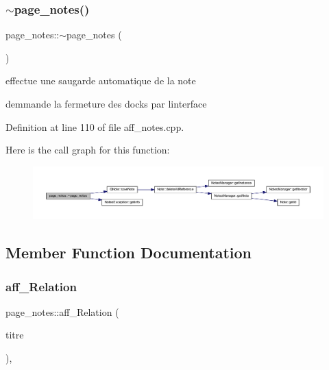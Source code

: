 \subsubsection{\texorpdfstring{$\sim$page\+\_\+notes()}{~page\_notes()}}
{\footnotesize\ttfamily page\+\_\+notes\+::$\sim$page\+\_\+notes (\begin{DoxyParamCaption}{ }\end{DoxyParamCaption})}



effectue une saugarde automatique de la note 

demmande la fermeture des docks par l\textquotesingle{}interface 

Definition at line 110 of file aff\+\_\+notes.\+cpp.

Here is the call graph for this function\+:\nopagebreak
\begin{figure}[H]
\begin{center}
\leavevmode
\includegraphics[width=350pt]{classpage__notes_a736d7d7d13818c43a20b20127845c6c0_cgraph}
\end{center}
\end{figure}


\subsection{Member Function Documentation}
\mbox{\label{classpage__notes_a5c00719607b3e0f3a78c3b35b6df4df9}} 
\subsubsection{\texorpdfstring{aff\+\_\+\+Relation}{aff\_Relation}}
{\footnotesize\ttfamily page\+\_\+notes\+::aff\+\_\+\+Relation (\begin{DoxyParamCaption}\item[{Q\+String}]{titre }\end{DoxyParamCaption})\hspace{0.3cm}{\ttfamily [inline]}, {\ttfamily [slot]}}



